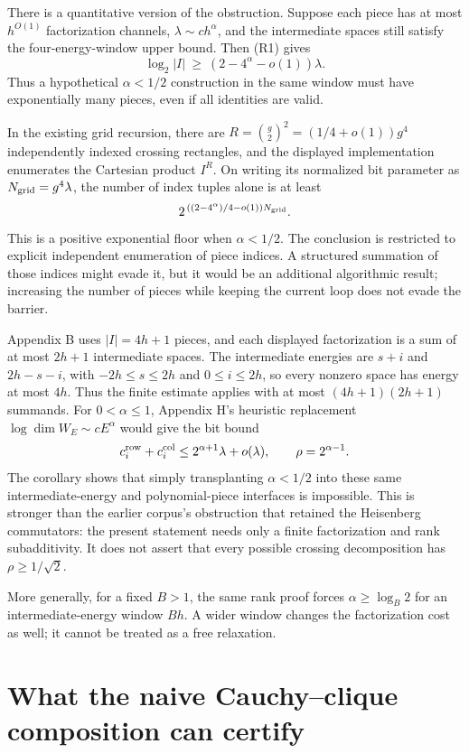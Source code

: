 There is a quantitative version of the obstruction.
Suppose each piece has at most $h^{O(1)}$ factorization channels,
$\lambda\sim c h^\alpha$, and the intermediate spaces still satisfy
the four-energy-window upper bound.  Then (R1) gives
\[
 \log_2|I|\ \ge\ (2-4^\alpha-o(1))\lambda.          \tag{R4}
\]
Thus a hypothetical $\alpha<1/2$ construction in the same window must
have exponentially many pieces, even if all identities are valid.

In the existing grid recursion, there are
$R=\binom g2^2=(1/4+o(1))g^4$ independently indexed crossing rectangles,
and the displayed implementation enumerates the Cartesian product
$I^R$.  On writing its normalized bit parameter as $N_{\rm grid}=g^4\lambda$,
the number of index tuples alone is at least
\[
 2^{\,((2-4^\alpha)/4-o(1))N_{\rm grid}}.
\]
This is a positive exponential floor when $\alpha<1/2$.
The conclusion is restricted to explicit independent enumeration of
piece indices.  A structured summation of those indices might evade it,
but it would be an additional algorithmic result; increasing the number
of pieces while keeping the current loop does not evade the barrier.


Appendix B uses $|I|=4h+1$ pieces, and each displayed factorization is a sum
of at most $2h+1$ intermediate spaces.  The intermediate energies are
$s+i$ and $2h-s-i$, with $-2h\le s\le2h$ and $0\le i\le2h$,
so every nonzero space has energy at most $4h$.
Thus the finite estimate applies with at most $(4h+1)(2h+1)$ summands.
For $0<\alpha\le1$, Appendix H's heuristic replacement
$\log\dim W_E\sim cE^\alpha$ would give the bit bound
\[
 c_i^{\rm row}+c_i^{\rm col}
 \le 2^{\alpha+1}\lambda+o(\lambda),
 \qquad \rho=2^{\alpha-1}.
\]
The corollary shows that simply transplanting $\alpha<1/2$ into these same
intermediate-energy and polynomial-piece interfaces is impossible.
This is stronger than the earlier corpus's obstruction \cite{roundtwo} that retained the
Heisenberg commutators: the present statement needs only a finite
factorization and rank subadditivity.  It does not assert that every
possible crossing decomposition has $\rho\ge1/\sqrt2$.

More generally, for a fixed $B>1$, the same rank proof forces $\alpha\ge\log_B2$ for an
intermediate-energy window $Bh$. A wider window changes the factorization
cost as well; it cannot be treated as a free relaxation.

\section{What the naive Cauchy--clique composition can certify}
\label{sec:nested-clique-obstruction}

